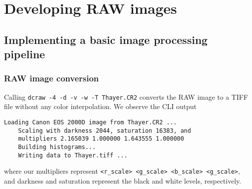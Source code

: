 \section{Developing RAW images}

\subsection{Implementing a basic image processing pipeline}

\subsubsection*{RAW image conversion}
Calling \texttt{dcraw -4 -d -v -w -T Thayer.CR2} 
converts the RAW image to a TIFF file without any color interpolation. 
We observe the CLI output
\begin{Verbatim}[fontsize=\small]
    Loading Canon EOS 2000D image from Thayer.CR2 ...
    Scaling with darkness 2044, saturation 16383, and
    multipliers 2.165039 1.000000 1.643555 1.000000
    Building histograms...
    Writing data to Thayer.tiff ...
\end{Verbatim}
where our multipliers represent \texttt{<r\_scale> <g\_scale> <b\_scale> <g\_scale>},
and darkness and saturation represent the black and white levels, respectively.